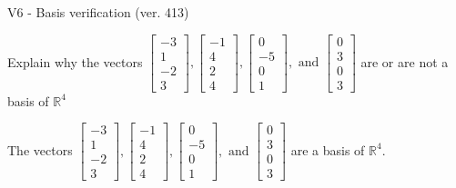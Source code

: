 \begin{exercise}
  \begin{exerciseTitle}V6 - Basis verification (ver. 413)\end{exerciseTitle}
  \begin{exerciseStatement}
    Explain why the vectors \(\left[\begin{array}{r}
-3 \\
1 \\
-2 \\
3
\end{array}\right] , \left[\begin{array}{r}
-1 \\
4 \\
2 \\
4
\end{array}\right] , \left[\begin{array}{r}
0 \\
-5 \\
0 \\
1
\end{array}\right] , \text{ and } \left[\begin{array}{r}
0 \\
3 \\
0 \\
3
\end{array}\right]\) are or are not a basis of \(\mathbb{R}^4\)	


  \end{exerciseStatement}
  \begin{exerciseAnswer}
   The vectors \(\left[\begin{array}{r}
-3 \\
1 \\
-2 \\
3
\end{array}\right] , \left[\begin{array}{r}
-1 \\
4 \\
2 \\
4
\end{array}\right] , \left[\begin{array}{r}
0 \\
-5 \\
0 \\
1
\end{array}\right] , \text{ and } \left[\begin{array}{r}
0 \\
3 \\
0 \\
3
\end{array}\right]\) 
  	 are  a basis of \(\mathbb{R}^4\).
  


  \end{exerciseAnswer}
\end{exercise}